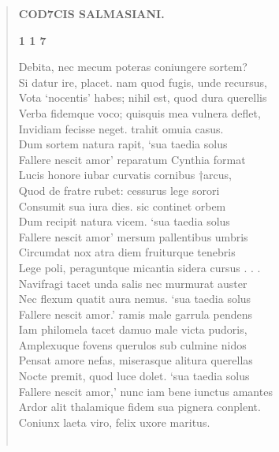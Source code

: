 \documentclass[11pt, a4paper]{report}
\begin{document}
\begin{verse}
    \begin{center} \textbf{COD7CIS SALMASIANI.} \end{center}\begin{center} \textbf{1 1 7} \end{center} \marginpar{[110]} Debita, nec mecum poteras coniungere sortem? \\ Si datur ire, placet. nam quod fugis, unde recursus, \\ Vota ‘nocentis’ habes; nihil est, quod dura querellis \\ Verba fidemque voco; quisquis mea vulnera deflet, \\ Invidiam fecisse neget. trahit omuia casus. \\ Dum sortem natura rapit, ‘sua taedia solus \\ Fallere nescit amor’ reparatum Cynthia format \\ Lucis honore iubar curvatis cornibus †arcus, \\ Quod de fratre rubet: cessurus lege sorori \\ Consumit sua iura dies. sic continet orbem \\ Dum recipit natura vicem. ‘sua taedia solus \\ Fallere nescit amor’ mersum pallentibus umbris \\ Circumdat nox atra diem fruiturque tenebris \\ Lege poli, peraguntque micantia sidera cursus . . . \\ Navifragi tacet unda salis nec murmurat auster \\ Nec flexum quatit aura nemus. ‘sua taedia solus \\ Fallere nescit amor.’ ramis male garrula pendens \\ Iam philomela tacet damuo male victa pudoris, \\ Amplexuque fovens querulos sub culmine nidos \\ Pensat amore nefas, miserasque alitura querellas \\ Nocte premit, quod luce dolet. ‘sua taedia solus \\ Fallere nescit amor,’ nunc iam bene iunctus amantes \\ Ardor alit thalamique fidem sua pignera conplent. \\ Coniunx laeta viro, felix uxore maritus. \\ 
        ﻿\pagebreak 

\end{verse}
\end{document}
